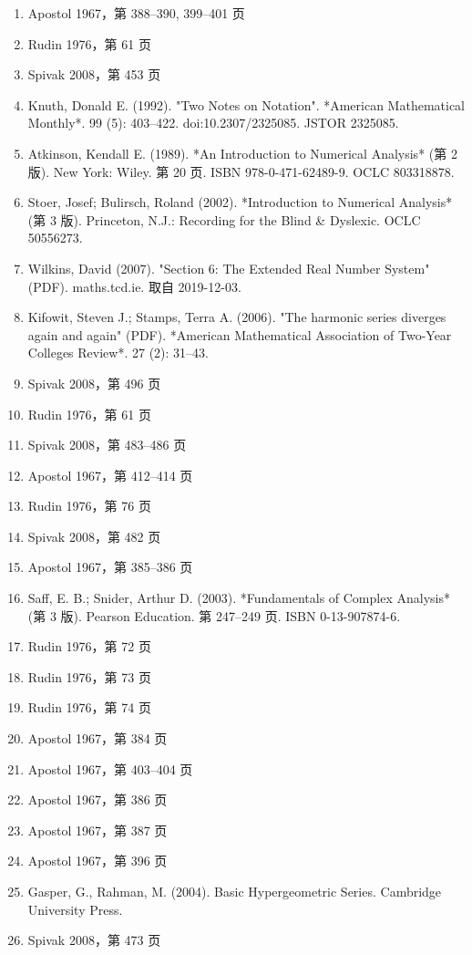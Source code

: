 \begin{enumerate}
\item Apostol 1967，第 388–390, 399–401 页
\item Rudin 1976，第 61 页
\item Spivak 2008，第 453 页
\item Knuth, Donald E. (1992). "Two Notes on Notation". *American Mathematical Monthly*. 99 (5): 403–422. doi:10.2307/2325085. JSTOR 2325085.
\item Atkinson, Kendall E. (1989). *An Introduction to Numerical Analysis* (第 2 版). New York: Wiley. 第 20 页. ISBN 978-0-471-62489-9. OCLC 803318878.
\item Stoer, Josef; Bulirsch, Roland (2002). *Introduction to Numerical Analysis* (第 3 版). Princeton, N.J.: Recording for the Blind & Dyslexic. OCLC 50556273.
\item Wilkins, David (2007). "Section 6: The Extended Real Number System" (PDF). maths.tcd.ie. 取自 2019-12-03.
\item Kifowit, Steven J.; Stamps, Terra A. (2006). "The harmonic series diverges again and again" (PDF). *American Mathematical Association of Two-Year Colleges Review*. 27 (2): 31–43.
\item Spivak 2008，第 496 页
\item Rudin 1976，第 61 页
\item Spivak 2008，第 483–486 页
\item Apostol 1967，第 412–414 页
\item Rudin 1976，第 76 页
\item Spivak 2008，第 482 页
\item Apostol 1967，第 385–386 页
\item Saff, E. B.; Snider, Arthur D. (2003). *Fundamentals of Complex Analysis* (第 3 版). Pearson Education. 第 247–249 页. ISBN 0-13-907874-6.
\item Rudin 1976，第 72 页
\item Rudin 1976，第 73 页
\item Rudin 1976，第 74 页
\item Apostol 1967，第 384 页
\item Apostol 1967，第 403–404 页
\item Apostol 1967，第 386 页
\item Apostol 1967，第 387 页
\item Apostol 1967，第 396 页
\item Gasper, G., Rahman, M. (2004). Basic Hypergeometric Series. Cambridge University Press.
\item Spivak 2008，第 473 页

\end{enumerate}
